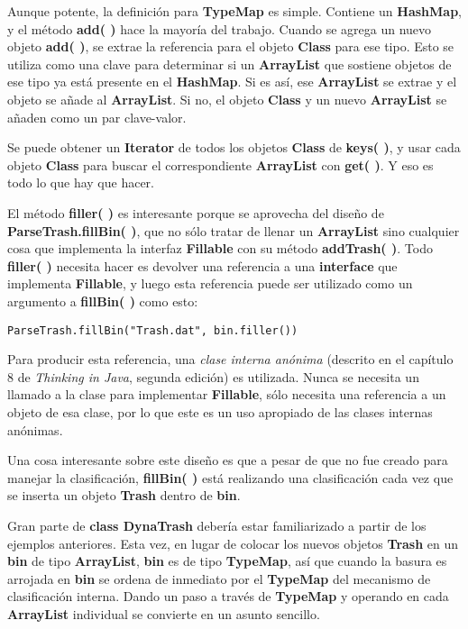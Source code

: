 Aunque potente, la definición para \textbf{TypeMap} es simple. Contiene un \textbf{HashMap}, y el método \textbf{add( )} hace la mayoría del trabajo. Cuando se agrega un nuevo objeto \textbf{add( )}, se extrae la referencia para el objeto \textbf{Class} para ese tipo. Esto se utiliza como una clave para determinar si un \textbf{ArrayList} que sostiene objetos de ese tipo ya está presente en el \textbf{HashMap}. Si es así, ese \textbf{ArrayList} se extrae y el objeto se añade al \textbf{ArrayList}. Si no, el objeto \textbf{Class} y un nuevo \textbf{ArrayList} se añaden como un par clave-valor.       \newline

Se puede obtener un \textbf{Iterator} de todos los objetos \textbf{Class} de   \textbf{keys( )}, y usar cada objeto \textbf{Class} para buscar el correspondiente \textbf{ArrayList} con \textbf{get( )}. Y eso es todo lo que hay que hacer.         \newline

El método \textbf{filler( )} es interesante porque se aprovecha del diseño de \textbf{ParseTrash.fillBin( )},  que no sólo tratar de llenar un \textbf{ArrayList} sino cualquier cosa que implementa la interfaz \textbf{Fillable} con su método \textbf{addTrash( )}.  Todo \textbf{filler( )} necesita hacer es devolver una referencia a una \textbf{interface} que implementa \textbf{Fillable}, y luego esta referencia puede ser utilizado como un argumento a \textbf{fillBin( )} como esto:    \newline

\begin{lstlisting} 
ParseTrash.fillBin("Trash.dat", bin.filler()) 
\end{lstlisting}

Para producir esta referencia, una \textit{clase interna anónima} (descrito en el capítulo 8 de \textit{Thinking in Java}, segunda edición) es utilizada. Nunca se necesita un llamado a la clase para implementar \textbf{Fillable}, sólo necesita una referencia a un objeto de esa clase, por lo que este es un uso apropiado de las clases internas anónimas. \newline

Una cosa interesante sobre este diseño es que a pesar de que no fue creado para manejar la clasificación, \textbf{fillBin( )} está realizando una clasificación cada vez que se inserta un objeto \textbf{Trash} dentro de \textbf{bin}.        \newline

Gran parte de \textbf{class DynaTrash} debería estar familiarizado a partir de los ejemplos anteriores. Esta vez, en lugar de colocar los nuevos objetos \textbf{Trash} en un \textbf{bin} de tipo \textbf{ArrayList}, \textbf{bin} es de tipo \textbf{TypeMap}, así que cuando la basura es arrojada en \textbf{bin} se ordena de inmediato por el \textbf{TypeMap} del mecanismo de clasificación interna. Dando un paso a través de \textbf{TypeMap} y operando en cada \textbf{ArrayList} individual se convierte en un asunto sencillo.  \newline

